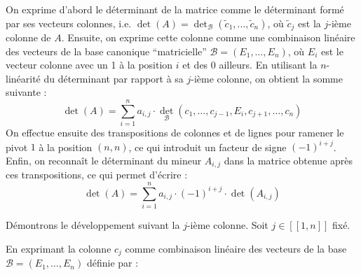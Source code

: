 \documentclass[11pt, a4paper]{article}
\theoremstyle{definition}
\begin{document}
\begin{tcolorbox}[methodstyle]
	On exprime d'abord le déterminant de la matrice comme le déterminant formé par ses vecteurs colonnes, i.e. $\det(A) = \det_\mathcal{B}(\tilde{c}_1, \dots, \tilde{c}_n)$, où $\tilde{c}_j$ est la $j$-ième colonne de $A$. Ensuite, on exprime cette colonne comme une combinaison linéaire des vecteurs de la base canonique ``matricielle'' $\mathcal{B} = (E_1, \dots, E_n)$, où $E_i$ est le vecteur colonne avec un 1 à la position $i$ et des 0 ailleurs. En utilisant la $n$-linéarité du déterminant par rapport à sa $j$-ième colonne, on obtient la somme suivante :
	$$\det(A) = \sum_{i=1}^{n} a_{i,j} \cdot \det_\mathcal{B}(c_1, \dots, c_{j-1}, E_i, c_{j+1}, \dots, c_n)$$
	On effectue ensuite des transpositions de colonnes et de lignes pour ramener le pivot $1$ à la position $(n,n)$, ce qui introduit un facteur de signe $(-1)^{i+j}$. Enfin, on reconnaît le déterminant du mineur $A_{i,j}$ dans la matrice obtenue après ces transpositions, ce qui permet d'écrire :
	$$\det(A) = \sum_{i=1}^{n} a_{i,j} \cdot (-1)^{i+j} \cdot \det(A_{i,j})$$
\end{tcolorbox}

Démontrons le développement suivant la $j$-ième colonne. Soit $j \in [\![1,n]\!]$ fixé.
    
En exprimant la colonne $c_j$ comme combinaison linéaire des vecteurs de la base $\mathcal B = (E_1,\dots,E_n)$ définie par :
\end{document}
